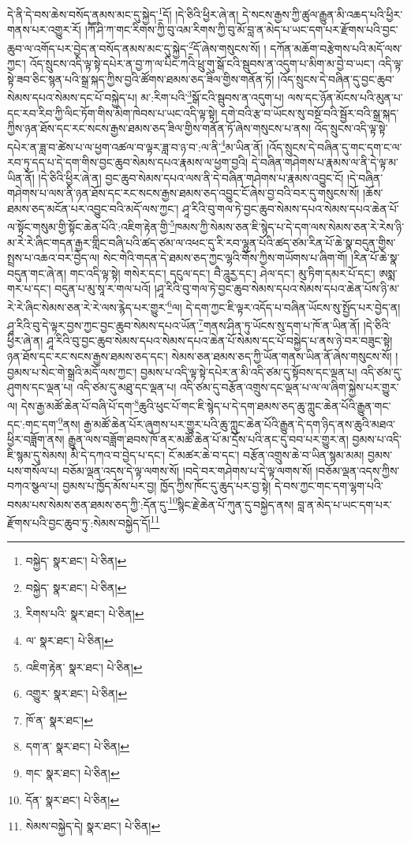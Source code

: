 དེ་ནི་དེ་བས་ཆེས་བསོད་ནམས་མང་དུ་སྐྱེད་\footnote{བསྐྱེད་  སྣར་ཐང་།  པེ་ཅིན། }དོ། །དེ་ཅིའི་ཕྱིར་ཞེ་ན། དེ་སངས་རྒྱས་ཀྱི་ཚུལ་རྒྱུན་མི་འཆད་པའི་ཕྱིར་གནས་པར་འགྱུར་རོ། །ཀཽ་ཤི་ཀ་གང་རིགས་ཀྱི་བུ་འམ་རིགས་ཀྱི་བུ་མོ་བླ་ན་མེད་པ་ཡང་དག་པར་རྫོགས་པའི་བྱང་ཆུབ་ལ་འགོད་པར་བྱེད་ན་བསོད་ནམས་མང་དུ་སྐྱེད་\footnote{བསྐྱེད་  སྣར་ཐང་།  པེ་ཅིན། }དོ་ཞེས་གསུངས་སོ། །
དཀོན་མཆོག་བརྩེགས་པའི་མདོ་ལས་ཀྱང་། འོད་སྲུངས་འདི་ལྟ་སྟེ་དཔེར་ན་བྱ་ཀ་ལ་པིང་ཀའི་ཕྲུ་གུ་སྒོ་ངའི་སྦུབས་ན་འདུག་པ་མིག་མ་བྱེ་བ་ཡང་། འདི་ལྟ་སྟེ་ཟབ་ཅིང་སྙན་པའི་སྒྲ་སྐད་ཀྱིས་བྱའི་ཚོགས་ཐམས་ཅད་ཟིལ་གྱིས་གནོན་ཏོ། །འོད་སྲུངས་དེ་བཞིན་དུ་བྱང་ཆུབ་སེམས་དཔའ་སེམས་དང་པོ་བསྐྱེད་པ། མ་:རིག་པའི་\footnote{རིགས་པའི་  སྣར་ཐང་།  པེ་ཅིན། }སྒོ་ངའི་སྦུབས་ན་འདུག་པ། ལས་དང་ཉོན་མོངས་པའི་མུན་པ་དང་རབ་རིབ་ཀྱི་ལིང་ཏོག་གིས་མིག་ཁེབས་པ་ཡང་འདི་ལྟ་སྟེ། དགེ་བའི་རྩ་བ་ཡོངས་སུ་བསྔོ་བའི་སྦྱོར་བའི་སྒྲ་སྐད་ཀྱིས་ཉན་ཐོས་དང་རང་སངས་རྒྱས་ཐམས་ཅད་ཟིལ་གྱིས་གནོན་ཏོ་ཞེས་གསུངས་པ་ནས། འོད་སྲུངས་འདི་ལྟ་སྟེ་དཔེར་ན་ཟླ་བ་ཚེས་པ་ལ་ཕྱག་འཚལ་བ་ལྟར་ཟླ་བ་ཉ་བ་:ལ་ནི་\footnote{ལ་  སྣར་ཐང་།  པེ་ཅིན། }མ་ཡིན་ནོ། །འོད་སྲུངས་དེ་བཞིན་དུ་གང་དག་ང་ལ་རབ་ཏུ་དད་པ་དེ་དག་གིས་བྱང་ཆུབ་སེམས་དཔའ་རྣམས་ལ་ཕྱག་བྱའི། དེ་བཞིན་གཤེགས་པ་རྣམས་ལ་ནི་དེ་ལྟ་མ་ཡིན་ནོ། །དེ་ཅིའི་ཕྱིར་ཞེ་ན། བྱང་ཆུབ་སེམས་དཔའ་ལས་ནི་དེ་བཞིན་གཤེགས་པ་རྣམས་འབྱུང་ངོ། །དེ་བཞིན་གཤེགས་པ་ལས་ནི་ཉན་ཐོས་དང་རང་སངས་རྒྱས་ཐམས་ཅད་འབྱུང་ངོ་ཞེས་བྱ་བའི་བར་དུ་གསུངས་སོ། །ཆོས་ཐམས་ཅད་མངོན་པར་འབྱུང་བའི་མདོ་ལས་ཀྱང་། ཤཱ་རིའི་བུ་གལ་ཏེ་བྱང་ཆུབ་སེམས་དཔའ་སེམས་དཔའ་ཆེན་པོ་ལ་སྟོང་གསུམ་གྱི་སྟོང་ཆེན་པོའི་:འཇིག་རྟེན་གྱི་\footnote{འཇིག་རྟེན་  སྣར་ཐང་།  པེ་ཅིན། }ཁམས་ཀྱི་སེམས་ཅན་ཇི་སྙེད་པ་དེ་དག་ལས་སེམས་ཅན་རེ་རེས་ཉི་མ་རེ་རེ་ཞིང་གདན་རྒྱར་གླིང་བཞི་པའི་ཚད་ཙམ་ལ་འཕང་དུ་རི་རབ་ལྷུན་པོའི་ཚད་ཙམ་རིན་པོ་ཆེ་སྣ་བདུན་གྱིས་སྤྲས་པ་འཆའ་བར་བྱེད་ལ། སེང་གེའི་གདན་དེ་ཐམས་ཅད་ཀྱང་ལྷའི་གོས་ཀྱིས་གཡོགས་པ་ཞིག་གོ། །རིན་པོ་ཆེ་སྣ་བདུན་གང་ཞེ་ན། གང་འདི་ལྟ་སྟེ། གསེར་དང་། དངུལ་དང་། བཻ་ཌཱུརྱ་དང་། ཤེལ་དང་། མུ་ཏིག་དམར་པོ་དང་། ཨསྨ་གར་པ་དང་། བདུན་པ་མུ་སཱ་ར་གལ་པའོ། །ཤཱ་རིའི་བུ་གལ་ཏེ་བྱང་ཆུབ་སེམས་དཔའ་སེམས་དཔའ་ཆེན་པོས་ཉི་མ་རེ་རེ་ཞིང་སེམས་ཅན་རེ་རེ་ལས་རྙེད་པར་གྱུར་\footnote{འགྱུར་  སྣར་ཐང་།  པེ་ཅིན། }ལ། དེ་དག་ཀྱང་ཇི་ལྟར་འདོད་པ་བཞིན་ཡོངས་སུ་སྤྱོད་པར་བྱེད་ན། ཤཱ་རིའི་བུ་དེ་ལྟར་བྱས་ཀྱང་བྱང་ཆུབ་སེམས་དཔའ་ཡོན་\footnote{ཁོ་ན་  སྣར་ཐང་། }གནས་ཤིན་ཏུ་ཡོངས་སུ་དག་པ་ཁོ་ན་ཡིན་ནོ། །དེ་ཅིའི་ཕྱིར་ཞེ་ན། ཤཱ་རིའི་བུ་བྱང་ཆུབ་སེམས་དཔའ་སེམས་དཔའ་ཆེན་པོ་སེམས་དང་པོ་བསྐྱེད་པ་ནས་ཉེ་བར་བཟུང་སྟེ། ཉན་ཐོས་དང་རང་སངས་རྒྱས་ཐམས་ཅད་དང་། སེམས་ཅན་ཐམས་ཅད་ཀྱི་ཡོན་གནས་ཡིན་ནོ་ཞེས་གསུངས་སོ། །བྱམས་པ་སེང་གེ་སྒྲའི་མདོ་ལས་ཀྱང་། བྱམས་པ་འདི་ལྟ་སྟེ་དཔེར་ན་མི་འདི་ཙམ་དུ་སྟོབས་དང་ལྡན་པ། འདི་ཙམ་དུ་ཤུགས་དང་ལྡན་པ། འདི་ཙམ་དུ་མཐུ་དང་ལྡན་པ། འདི་ཙམ་དུ་བརྩོན་འགྲུས་དང་ལྡན་པ་ལ་ལ་ཞིག་སྐྱེས་པར་གྱུར་ལ། དེས་རྒྱ་མཚོ་ཆེན་པོ་བཞི་པོ་དག་\footnote{དག་ན་  སྣར་ཐང་།  པེ་ཅིན། }ཆུའི་ཕུང་པོ་གང་ཇི་སྙེད་པ་དེ་དག་ཐམས་ཅད་ཆུ་ཀླུང་ཆེན་པོའི་རྒྱུན་གང་དང་:གང་དག་\footnote{གང་  སྣར་ཐང་།  པེ་ཅིན། }ནས། རྒྱ་མཚོ་ཆེན་པོར་ཞུགས་པར་གྱུར་པའི་ཆུ་ཀླུང་ཆེན་པོའི་རྒྱུན་དེ་དག་ཉིད་ནས་ཆུའི་མཐའ་ཕྱིར་བཟློག་ནས། རྒྱུན་ལས་བཟློག་ཐབས་ཁོ་ནར་མཚོ་ཆེན་པོ་མ་དྲོས་པའི་ནང་དུ་བབ་པར་གྱུར་ན། བྱམས་པ་འདི་ཇི་སྙམ་དུ་སེམས། མི་དེ་དཀའ་བ་བྱེད་པ་དང་། ངོ་མཚར་ཆེ་བ་དང་། བརྩོན་འགྲུས་ཆེ་བ་ཡིན་སྙམ་མམ། བྱམས་པས་གསོལ་པ། བཅོམ་ལྡན་འདས་དེ་ལྟ་ལགས་སོ། །བདེ་བར་གཤེགས་པ་དེ་ལྟ་ལགས་སོ། །བཅོམ་ལྡན་འདས་ཀྱིས་བཀའ་སྩལ་པ། བྱམས་པ་ཁྱོད་མོས་པར་བྱ། ཁྱོད་ཀྱིས་ཁོང་དུ་ཆུད་པར་བྱ་སྟེ། དེ་བས་ཀྱང་གང་དག་ལྷག་པའི་བསམ་པས་སེམས་ཅན་ཐམས་ཅད་ཀྱི་:དོན་དུ་\footnote{དོན་  སྣར་ཐང་།  པེ་ཅིན། }སྙིང་རྗེ་ཆེན་པོ་ཀུན་དུ་བསྐྱེད་ནས། བླ་ན་མེད་པ་ཡང་དག་པར་རྫོགས་པའི་བྱང་ཆུབ་ཏུ་:སེམས་བསྐྱེད་དོ།\footnote{སེམས་བསྐྱེད་དེ།  སྣར་ཐང་།  པེ་ཅིན། } 